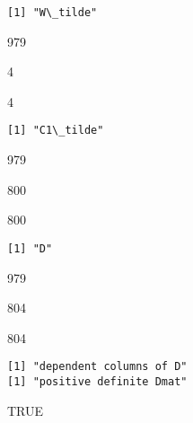 \documentclass[11pt]{article}
\begin{document}
    \begin{Verbatim}[commandchars=\\\{\}]
[1] "W\_tilde"

    \end{Verbatim}

    \begin{enumerate*}
\item 979
\item 4
\end{enumerate*}


    
    4

    
    \begin{Verbatim}[commandchars=\\\{\}]
[1] "C1\_tilde"

    \end{Verbatim}

    \begin{enumerate*}
\item 979
\item 800
\end{enumerate*}


    
    800

    
    \begin{Verbatim}[commandchars=\\\{\}]
[1] "D"

    \end{Verbatim}

    \begin{enumerate*}
\item 979
\item 804
\end{enumerate*}


    
    804

    
    \begin{Verbatim}[commandchars=\\\{\}]
[1] "dependent columns of D"
[1] "positive definite Dmat"

    \end{Verbatim}

    TRUE
\end{document}
